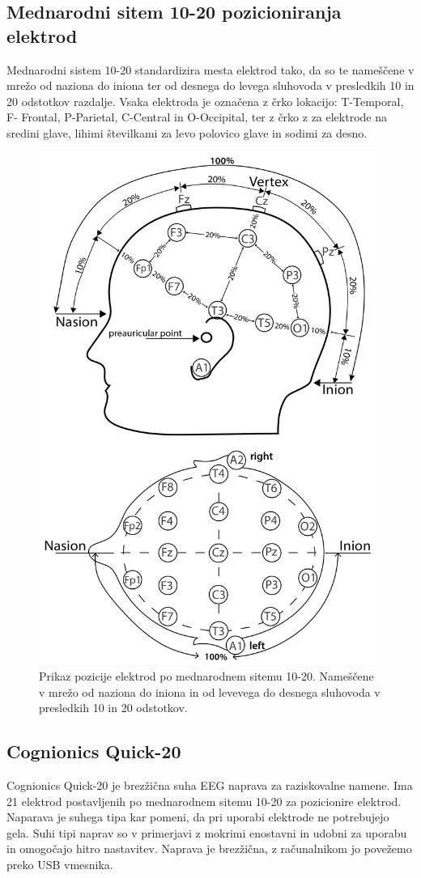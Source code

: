 \subsection{Mednarodni sitem 10-20 pozicioniranja elektrod}
Mednarodni sistem 10-20 standardizira mesta elektrod tako, da so te  nameščene v mrežo od naziona do iniona ter od desnega do levega sluhovoda v presledkih 10 in 20 odstotkov razdalje. Vsaka elektroda je označena z črko lokacijo: T-Temporal, F- Frontal, P-Parietal, C-Central in O-Occipital, ter z črko z za elektrode na sredini glave, lihimi številkami za levo polovico glave in sodimi za desno. \cite{klem_ten-twenty_1999}
\begin{figure}[h!]
    \begin{center}
    \includegraphics[width=0.7\linewidth]{slike/1020-diagram1.jpg}
    \end{center}
    \caption{Prikaz pozicije elektrod po mednarodnem sitemu 10-20. Nameščene v mrežo od naziona do iniona in od levevega do desnega sluhovoda v presledkih 10 in 20 odstotkov.}
    \end{figure}


\subsection{Cognionics Quick-20}
Cognionics Quick-20 je brezžična suha EEG naprava za raziskovalne namene. Ima 21 elektrod postavljenih po mednarodnem sitemu 10-20 za pozicionire elektrod. Naparava je suhega tipa kar pomeni, da pri uporabi elektrode ne potrebujejo gela. Suhi tipi naprav so v primerjavi z mokrimi enostavni in udobni za uporabu in omogočajo hitro nastavitev. Naprava je brezžična, z računalnikom jo povežemo preko USB vmesnika.

